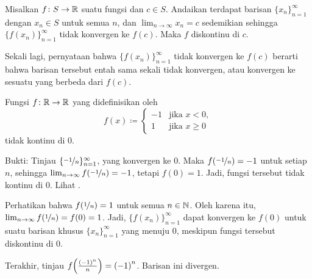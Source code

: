 \begin{prop}
Misalkan $f \colon S \to {\mathbb{R}}$ suatu fungsi dan $c \in S$.  Andaikan
terdapat barisan $\{ x_n \}_{n=1}^\infty$ dengan $x_n \in S$ untuk semua $n$,
dan $\lim_{n\to\infty} x_n = c$
sedemikian sehingga $\bigl\{ f(x_n) \bigr\}_{n=1}^\infty$
tidak konvergen ke $f(c)$.
Maka $f$ diskontinu di $c$.
\end{prop}

Sekali lagi,
pernyataan bahwa
$\bigl\{ f(x_n) \bigr\}_{n=1}^\infty$ tidak konvergen ke $f(c)$
berarti bahwa barisan tersebut
entah sama sekali tidak konvergen,
atau konvergen ke sesuatu
yang berbeda dari $f(c)$.

\begin{example} \label{example:jumpdiscont}
Fungsi $f \colon {\mathbb{R}} \to {\mathbb{R}}$ yang didefinisikan oleh
\begin{equation*}
f(x) \coloneqq 
\begin{cases}
-1 & \text{jika } x < 0, \\
1 & \text{jika } x \geq 0
\end{cases}
\end{equation*}
tidak kontinu di 0.

Bukti: Tinjau $\{ \nicefrac{-1}{n} \}_{n=1}^\infty$, yang konvergen ke 0.  Maka
$f(\nicefrac{-1}{n}) = -1$ untuk setiap $n$,
sehingga
$\lim_{n\to\infty} f(\nicefrac{-1}{n}) = -1$, tetapi $f(0) = 1$.  Jadi, fungsi tersebut
tidak kontinu di 0.  Lihat
.

\begin{myfigureht}
\caption{Diskontinuitas loncat.  Nilai
$f(\nicefrac{-1}{n})$ dan $f(0)$ ditandai sebagai titik hitam.\label{fig:jumpdiscont}}
\end{myfigureht}

Perhatikan bahwa $f(\nicefrac{1}{n}) = 1$ untuk semua $n \in {\mathbb{N}}$.
Oleh karena itu, $\lim_{n\to\infty} f(\nicefrac{1}{n}) = f(0) = 1$.  Jadi,
$\bigl\{ f(x_n) \bigr\}_{n=1}^\infty$ dapat konvergen ke $f(0)$
untuk suatu barisan khusus
$\{ x_n \}_{n=1}^\infty$ yang menuju 0,
meskipun fungsi tersebut diskontinu di 0.

Terakhir, tinjau $f\Bigl(\frac{{(-1)}^n}{n}\Bigr) = {(-1)}^n$.
Barisan ini divergen.
\end{example}

